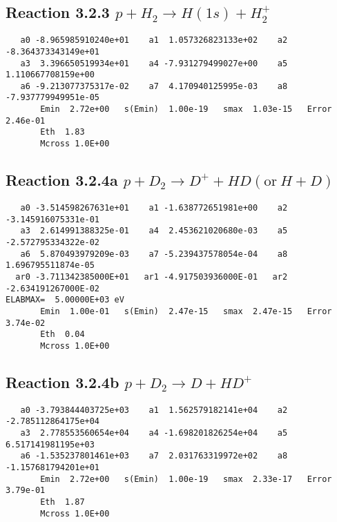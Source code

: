 \documentclass[12pt,dvipdfm]{article}
\begin{document}
\newpage
\subsection{
Reaction 3.2.3 $   p + H_2 \rightarrow H(1s) + H_2^+$}


\begin{small}\begin{verbatim}
   a0 -8.965985910240e+01    a1  1.057326823133e+02    a2 -8.364373343149e+01
   a3  3.396650519934e+01    a4 -7.931279499027e+00    a5  1.110667708159e+00
   a6 -9.213077375317e-02    a7  4.170940125995e-03    a8 -7.937779949951e-05
       Emin  2.72e+00   s(Emin)  1.00e-19   smax  1.03e-15   Error  2.46e-01
       Eth  1.83
       Mcross 1.0E+00
\end{verbatim}\end{small}

\newpage
\subsection{
Reaction 3.2.4a $   p + D_2 \rightarrow D^+ + HD (\mbox{or}~ H + D)$}


\begin{small}\begin{verbatim}
   a0 -3.514598267631e+01    a1 -1.638772651981e+00    a2 -3.145916075331e-01
   a3  2.614991388325e-01    a4  2.453621020680e-03    a5 -2.572795334322e-02
   a6  5.870493979209e-03    a7 -5.239437578054e-04    a8  1.696795511874e-05
  ar0 -3.711342385000E+01   ar1 -4.917503936000E-01   ar2 -2.634191267000E-02
ELABMAX=  5.00000E+03 eV
       Emin  1.00e-01   s(Emin)  2.47e-15   smax  2.47e-15   Error  3.74e-02
       Eth  0.04
       Mcross 1.0E+00
\end{verbatim}\end{small}

\newpage
\subsection{
Reaction 3.2.4b $   p + D_2 \rightarrow D + HD^+$}


\begin{small}\begin{verbatim}
   a0 -3.793844403725e+03    a1  1.562579182141e+04    a2 -2.785112864175e+04
   a3  2.778553560654e+04    a4 -1.698201826254e+04    a5  6.517141981195e+03
   a6 -1.535237801461e+03    a7  2.031763319972e+02    a8 -1.157681794201e+01
       Emin  2.72e+00   s(Emin)  1.00e-19   smax  2.33e-17   Error  3.79e-01
       Eth  1.87
       Mcross 1.0E+00
\end{verbatim}\end{small}
\end{document}
